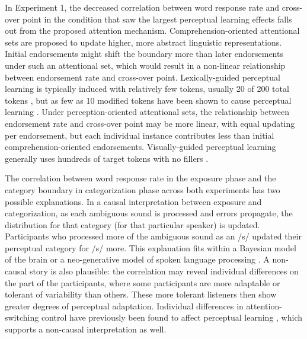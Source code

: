 In Experiment 1, the decreased correlation between word response rate and cross-over point in the condition that saw the largest perceptual learning effects falls out from the proposed attention mechanism.
Comprehension-oriented attentional sets are proposed to update higher, more abstract linguistic representations.
Initial endorsements might shift the boundary more than later endorsements under such an attentional set, which would result in a non-linear relationship between endorsement rate and cross-over point.
Lexically-guided perceptual learning is typically induced with relatively few tokens, usually 20 of 200 total tokens \citep{Norris2003, Reinisch2013}, but as few as 10 modified tokens have been shown to cause perceptual learning \citep{Kraljic2008}.
Under perception-oriented attentional sets, the relationship between endorsement rate and cross-over point may be more linear, with equal updating per endorsement, but each individual instance contributes less than initial comprehension-oriented endorsements.
Visually-guided perceptual learning generally uses hundreds of target tokens with no fillers \citep{Vroomen2007, Reinisch2014}.

The correlation between word response rate in the exposure phase and the category boundary in categorization phase across both experiments has two possible explanations. 
In a causal interpretation between exposure and categorization, as each ambiguous sound is processed and errors propagate, the distribution for that category (for that particular speaker) is updated.
Participants who processed more of the ambiguous sound as an /s/ updated their perceptual category for /s/ more. 
This explanation fits within a Bayesian model of the brain \citep{Clark2013} or a neo-generative model of spoken language processing \citep{Pierrehumbert2002}.  
A non-causal story is also plausible:  the correlation may reveal individual differences on the part of the participants, where some participants are more adaptable or tolerant of variability than others.
These more tolerant listeners then show greater degrees of perceptual adaptation. 
Individual differences in attention-switching control have previously been found to affect perceptual learning \citep{Scharenborg2014}, which supports a non-causal interpretation as well.

